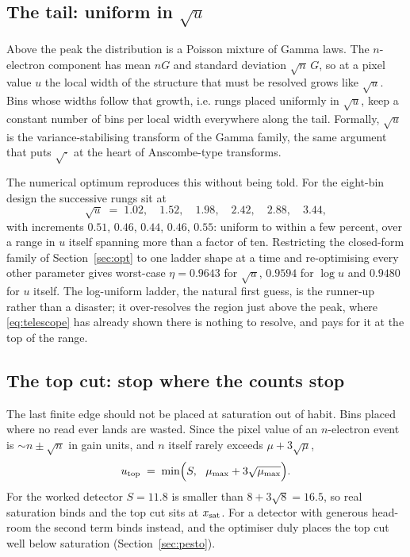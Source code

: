 \documentclass[11pt,a4paper]{article}
\begin{document}
\subsection{The tail: uniform in $\sqrt{u}$}

Above the peak the distribution is a Poisson mixture of Gamma laws. The
$n$-electron component has mean $nG$ and standard deviation $\sqrt{n}\,G$, so at
a pixel value $u$ the local width of the structure that must be resolved grows
like $\sqrt{u}$. Bins whose widths follow that growth, i.e. rungs placed
uniformly in $\sqrt{u}$, keep a constant number of bins per local width
everywhere along the tail. Formally, $\sqrt{u}$ is the variance-stabilising
transform of the Gamma family, the same argument that puts $\sqrt{\cdot}$ at the
heart of Anscombe-type transforms.

The numerical optimum reproduces this without being told. For the eight-bin
design the successive rungs sit at
\begin{equation*}
  \sqrt{u} \;=\; 1.02,\quad 1.52,\quad 1.98,\quad 2.42,\quad 2.88,\quad 3.44,
\end{equation*}
with increments $0.51$, $0.46$, $0.44$, $0.46$, $0.55$: uniform to within a few
percent, over a range in $u$ itself spanning more than a factor of ten.
Restricting the closed-form family of Section~\ref{sec:opt} to one ladder shape
at a time and re-optimising every other parameter gives worst-case
$\eta = 0.9643$ for $\sqrt{u}$, $0.9594$ for $\log u$ and $0.9480$ for $u$
itself. The log-uniform ladder, the natural first guess, is the runner-up
rather than a disaster; it over-resolves the region just above the peak, where
\eqref{eq:telescope} has already shown there is nothing to resolve, and pays
for it at the top of the range.

\subsection{The top cut: stop where the counts stop}

The last finite edge should not be placed at saturation out of habit. Bins
placed where no read ever lands are wasted. Since the pixel value of an
$n$-electron event is $\sim\!n \pm \sqrt{n}$ in gain units, and $n$ itself
rarely exceeds $\mu + 3\sqrt{\mu}$,
\begin{equation}
  u_{\rm top} \;=\; \min\!\Big(S,\ \ \mu_{\max} + 3\sqrt{\mu_{\max}}\Big).
\end{equation}
For the worked detector $S = 11.8$ is smaller than $8 + 3\sqrt{8} = 16.5$, so
real saturation binds and the top cut sits at $x_{\rm sat}$. For a detector
with generous head-room the second term binds instead, and the optimiser duly
places the top cut well below saturation (Section~\ref{sec:pesto}).
\end{document}

